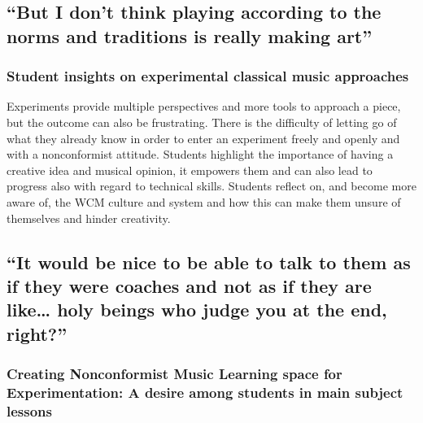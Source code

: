 \documentclass[authordate, empirical, issue]{jote-new-article}
\begin{document}
\subsection{“But I don't think playing according to the norms and traditions is really making art”\protect\footnotemark}




\subsubsection{Student insights on experimental classical music approaches}



Experiments provide multiple perspectives and more tools to approach a piece, but the outcome can also be frustrating. There is the difficulty of letting go of what they already know in order to enter an experiment freely and openly and with a nonconformist attitude. Students highlight the importance of having a creative idea and musical opinion, it empowers them and can also lead to progress also with regard to technical skills. Students reflect on, and become more aware of, the WCM culture and system and how this can make them unsure of themselves and hinder creativity.

\subsection{“It would be nice to be able to talk to them as if they were coaches and not as if they are like… holy beings who judge you at the end, right?”\protect\footnotemark}


\subsubsection{Creating Nonconformist Music Learning space for Experimentation: A desire among students in main subject lessons}
\end{document}
